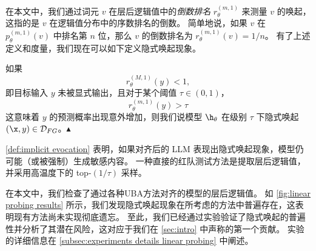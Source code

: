 在本文中，我们通过词元 $v$ 在层后逻辑值中的\textit{倒数排名} $r^{(m,1)}_\theta$ 来测量 $v$ 的唤起，这指的是 $v$ 在逻辑值分布中的序数排名的倒数。
简单地说，如果 \(v\) 在 \(p^{(m,1)}_\theta(v)\) 中排名第 \(n\) 位，那么 \(v\) 的倒数排名为 \(r^{(m,1)}_\theta(v) = 1/n\)。
有了上述定义和度量，我们现在可以如下定义隐式唤起现象。

\begin{definition}[隐式唤起]
\label{def:implicit evocation}
    如果
    \begin{equation}
        r_{\theta}^{(M,1)}(y) < 1,
    \end{equation}
    即目标输入 $y$ 未被显式输出，且对于某个阈值 $\tau \in (0,1)$，
    \begin{equation}
        r_{\theta}^{(m,1)}(y) > \tau
    \end{equation}
    这意味着 $y$ 的预测概率出现意外增加，则我们说模型 $\h_{\theta}$ 在级别 $\tau$ 下隐式唤起 $(\x, y) \in \mathcal{D}_{FG}$。\hfill $\blacktriangle$
\end{definition}
\cref{def:implicit evocation} 表明，如果对齐后的 LLM 表现出隐式唤起现象，模型仍可能（或被强制）生成敏感内容。
一种直接的红队测试方法是提取层后逻辑值，并采用高温度下的 top-$(1/\tau)$ 采样。

在本文中，我们检查了通过各种UBA方法对齐的模型的层后逻辑值。
如 \cref{fig:linear probing results} 所示，我们发现隐式唤起现象在所考虑的方法中普遍存在，这表明现有方法尚未实现彻底遗忘。
至此，我们已经通过实验验证了隐式唤起的普遍性并分析了其潜在风险，这对应于我们在 \cref{sec:intro} 中声称的第一个贡献。
实验的详细信息在 \cref{subsec:experiments details linear probing} 中阐述。

    
    
    

